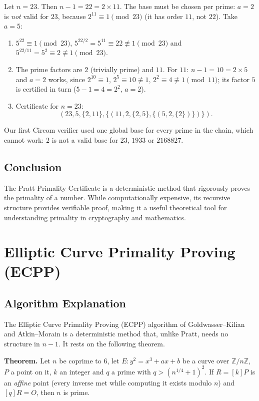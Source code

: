 \documentclass[12pt]{article}
\begin{document}
Let \( n = 23 \). Then \( n-1 = 22 = 2 \times 11 \). The base must be chosen per prime: \( a = 2 \) is \emph{not} valid for \( 23 \), because \( 2^{11} \equiv 1 \pmod{23} \) (it has order \( 11 \), not \( 22 \)). Take \( a = 5 \):
\begin{enumerate}
    \item \( 5^{22} \equiv 1 \pmod{23} \), \( 5^{22/2} = 5^{11} \equiv 22 \not\equiv 1 \pmod{23} \) and \( 5^{22/11} = 5^{2} \equiv 2 \not\equiv 1 \pmod{23} \).
    \item The prime factors are \( 2 \) (trivially prime) and \( 11 \). For \( 11 \): \( n-1 = 10 = 2 \times 5 \) and \( a = 2 \) works, since \( 2^{10} \equiv 1 \), \( 2^{5} \equiv 10 \not\equiv 1 \), \( 2^{2} \equiv 4 \not\equiv 1 \pmod{11} \); its factor \( 5 \) is certified in turn (\( 5 - 1 = 4 = 2^2 \), \( a = 2 \)).
    \item Certificate for \( n = 23 \):
    \[
    (23, 5, \{2, 11\}, \{(11, 2, \{2, 5\}, \{(5, 2, \{2\})\})\}).
    \]
\end{enumerate}
Our first Circom verifier used one global base for every prime in the chain, which cannot work: \( 2 \) is not a valid base for \( 23 \), \( 1933 \) or \( 2168827 \).

\subsection*{Conclusion}

The Pratt Primality Certificate is a deterministic method that rigorously proves the primality of a number. While computationally expensive, its recursive structure provides verifiable proof, making it a useful theoretical tool for understanding primality in cryptography and mathematics.

\section{Elliptic Curve Primality Proving (ECPP)}\label{sec:ecpp}

\subsection*{Algorithm Explanation}

The Elliptic Curve Primality Proving (ECPP) algorithm of Goldwasser--Kilian and Atkin--Morain is a deterministic method that, unlike Pratt, needs no structure in \( n-1 \). It rests on the following theorem.

\textbf{Theorem.} Let \( n \) be coprime to \( 6 \), let \( E: y^2 = x^3 + ax + b \) be a curve over \( \mathbb{Z}/n\mathbb{Z} \), \( P \) a point on it, \( k \) an integer and \( q \) a prime with \( q > (n^{1/4}+1)^2 \). If \( R = [k]P \) is an \emph{affine} point (every inverse met while computing it exists modulo \( n \)) and \( [q]R = O \), then \( n \) is prime.
\end{document}
